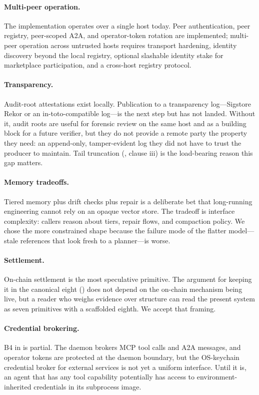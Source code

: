 \documentclass[11pt]{article}
\theoremstyle{plainsmall}
\begin{document}
\paragraph{Multi-peer operation.} The implementation operates over a single host today. Peer authentication, peer registry, peer-scoped A2A, and operator-token rotation are implemented; multi-peer operation across untrusted hosts requires transport hardening, identity discovery beyond the local registry, optional slashable identity stake for marketplace participation, and a cross-host registry protocol.

\paragraph{Transparency.} Audit-root attestations exist locally. Publication to a transparency log---Sigstore Rekor or an in-toto-compatible log---is the next step but has not landed. Without it, audit roots are useful for forensic review on the same host and as a building block for a future verifier, but they do not provide a remote party the property they need: an append-only, tamper-evident log they did not have to trust the producer to maintain. Tail truncation (, clause iii) is the load-bearing reason this gap matters.

\paragraph{Memory tradeoffs.} Tiered memory plus drift checks plus repair is a deliberate bet that long-running engineering cannot rely on an opaque vector store. The tradeoff is interface complexity: callers reason about tiers, repair flows, and compaction policy. We chose the more constrained shape because the failure mode of the flatter model---stale references that look fresh to a planner---is worse.

\paragraph{Settlement.} On-chain settlement is the most speculative primitive. The argument for keeping it in the canonical eight () does not depend on the on-chain mechanism being live, but a reader who weighs evidence over structure can read the present system as seven primitives with a scaffolded eighth. We accept that framing.

\paragraph{Credential brokering.} B4 in  is partial. The daemon brokers MCP tool calls and A2A messages, and operator tokens are protected at the daemon boundary, but the OS-keychain credential broker for external services is not yet a uniform interface. Until it is, an agent that has any tool capability potentially has access to environment-inherited credentials in its subprocess image.
\end{document}
